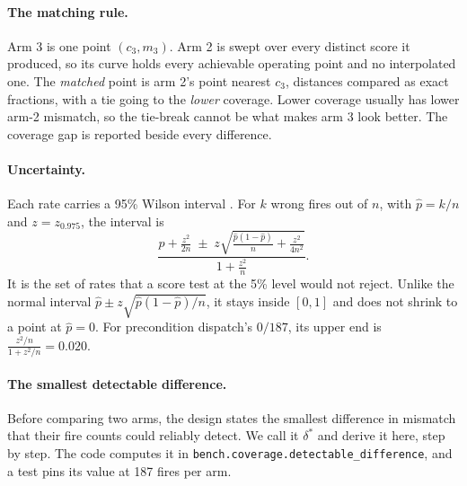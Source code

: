 \documentclass[11pt]{article}
\newcommand{\code}[1]{\texttt{#1}}
\begin{document}
\paragraph{The matching rule.}
Arm 3 is one point $(c_3, m_3)$. Arm 2 is swept over every distinct score it produced, so its
curve holds every achievable operating point and no interpolated one. The \emph{matched} point is
arm 2's point nearest $c_3$, distances compared as exact fractions, with a tie going to the
\emph{lower} coverage. Lower coverage usually has lower arm-2 mismatch, so the tie-break cannot be
what makes arm 3 look better. The coverage gap is reported beside every difference.

\paragraph{Uncertainty.}
Each rate carries a 95\% Wilson interval \cite{wilson1927}. For $k$ wrong fires out of $n$, with
$\hat p=k/n$ and $z=z_{0.975}$, the interval is
\[
  \frac{\hat p+\frac{z^2}{2n}\;\pm\;z\sqrt{\frac{\hat p(1-\hat p)}{n}+\frac{z^2}{4n^2}}}{1+\frac{z^2}{n}}.
\]
It is the set of rates that a score test at the 5\% level would not reject. Unlike the normal
interval $\hat p\pm z\sqrt{\hat p(1-\hat p)/n}$, it stays inside $[0,1]$ and does not shrink to a
point at $\hat p=0$. For precondition dispatch's $0/187$, its upper end is
$\frac{z^2/n}{1+z^2/n}=0.020$.

\paragraph{The smallest detectable difference.}
Before comparing two arms, the design states the smallest difference in mismatch that their fire
counts could reliably detect. We call it $\delta^\ast$ and derive it here, step by step. The code
computes it in \code{bench.coverage.detectable\_difference}, and a test pins its value at 187
fires per arm.
\end{document}
